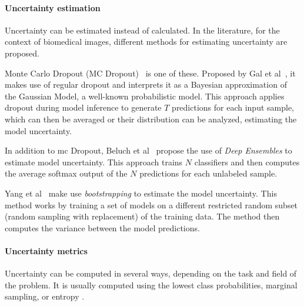     \paragraph{Uncertainty estimation}
    Uncertainty can be estimated instead of calculated. In the literature, for the context of biomedical images, different methods for estimating uncertainty are proposed.
    
    Monte Carlo Dropout (MC Dropout)~\cite{beluch2018power, gal2016dropout, ozdemir2018active} is one of these. Proposed by Gal et al~\cite{gal2016dropout}, it makes use of regular dropout and interprets it as a Bayesian approximation of the Gaussian Model, a well-known probabilistic model.
    This approach applies dropout during model inference to generate $T$ predictions for each input sample, which can then be averaged or their distribution can be analyzed, estimating the model uncertainty.
    
    
    In addition to \acrshort{mc} Dropout, Beluch et al~\cite{beluch2018power} propose the use of \emph{Deep Ensembles} to estimate model uncertainty. This approach trains $N$ classifiers and then computes the average softmax output of the $N$ predictions for each unlabeled sample.
    
   Yang et al~\cite{yang2017suggestive} make use \emph{bootstrapping} \cite{efron1994introduction} to estimate the model uncertainty. This method works by training a set of models on a different restricted random subset (random sampling with replacement) of the training data. The method then computes the variance between the model predictions.
    
    \paragraph{Uncertainty metrics}
    Uncertainty can be computed in several ways, depending on the task and field of the problem.
    It is usually computed using the lowest class probabilities, marginal sampling, or entropy \cite{shannon1948mathematical}.
    
